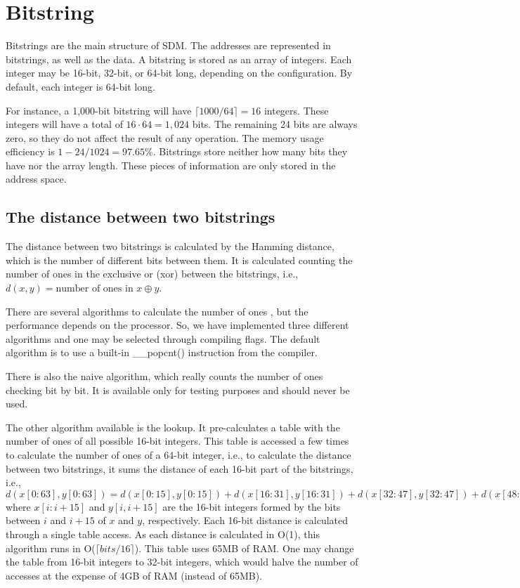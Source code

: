 \section{Bitstring}

Bitstrings are the main structure of SDM. The addresses are represented in bitstrings, as well as the data. A bitstring is stored as an array of integers. Each integer may be 16-bit, 32-bit, or 64-bit long, depending on the configuration. By default, each integer is 64-bit long.

For instance, a 1,000-bit bitstring will have $\lceil 1000/64 \rceil = 16$ integers. These integers will have a total of $16 \cdot 64 = 1,024$ bits. The remaining 24 bits are always zero, so they do not affect the result of any operation. The memory usage efficiency is $1 - 24/1024 = 97.65\%$. Bitstrings store neither how many bits they have nor the array length. These pieces of information are only stored in the address space.


\subsection{The distance between two bitstrings}

The distance between two bitstrings is calculated by the Hamming distance, which is the number of different bits between them. It is calculated counting the number of ones in the exclusive or (xor) between the bitstrings, i.e., $d(x, y) = \text{number of ones in } x \oplus y$.

There are several algorithms to calculate the number of ones \citep{warren2013hacker}, but the performance depends on the processor. So, we have implemented three different algorithms and one may be selected through compiling flags. The default algorithm is to use a built-in \_\_popcnt() instruction from the compiler.

There is also the naive algorithm, which really counts the number of ones checking bit by bit. It is available only for testing purposes and should never be used.

The other algorithm available is the lookup. It pre-calculates a table with the number of ones of all possible 16-bit integers. This table is accessed a few times to calculate the number of ones of a 64-bit integer, i.e., to calculate the distance between two bitstrings, it sums the distance of each 16-bit part of the bitstrings, i.e., $d(x[0:63], y[0:63]) = d(x[0:15], y[0:15]) + d(x[16:31], y[16:31]) + d(x[32:47], y[32:47]) + d(x[48:63], y[48:63])$ where $x[i:i+15]$ and $y[i, i+15]$ are the 16-bit integers formed by the bits between $i$ and $i+15$ of $x$ and $y$, respectively. Each 16-bit distance is calculated through a single table access. As each distance is calculated in O(1), this algorithm runs in O($\lceil bits/16 \rceil$). This table uses 65MB of RAM. One may change the table from 16-bit integers to 32-bit integers, which would halve the number of accesses at the expense of 4GB of RAM (instead of 65MB).



